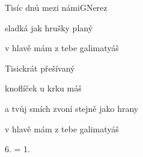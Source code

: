 \begin{song}{Tisíc dnů mezi námi}{G}{Nerez}
\begin{SBVerse}
sladká jak hrušky planý

v hlavě mám z tebe galimatyáš

\end{SBVerse}

\begin{SBVerse}

Tisickrát přešívaný

knoflíček u krku máš

a tvůj smích zvoní stejně jako hrany

v hlavě mám z tebe galimatyáš

\end{SBVerse}

6. = 1.

\begin{SBChorus}

\end{SBChorus}

\end{song}

\clearpage
